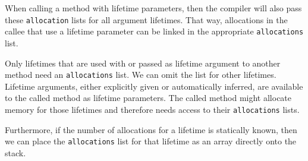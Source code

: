 When calling a method with lifetime parameters, then the compiler will also pass these \texttt{allocation} lists for all argument lifetimes.
That way, allocations in the callee that use a lifetime parameter can be linked in the appropriate \texttt{allocations} list.

Only lifetimes that are used with  or passed as lifetime argument to another method need an \texttt{allocations} list.
We can omit the list for other lifetimes.
Lifetime arguments, either explicitly given or automatically inferred, are available to the called method as lifetime parameters.
The called method might allocate memory for those lifetimes and therefore needs access to their \texttt{allocations} lists.

Furthermore, if the number of allocations for a lifetime is statically known, then we can place the \texttt{allocations} list for that lifetime as an array directly onto the stack.
